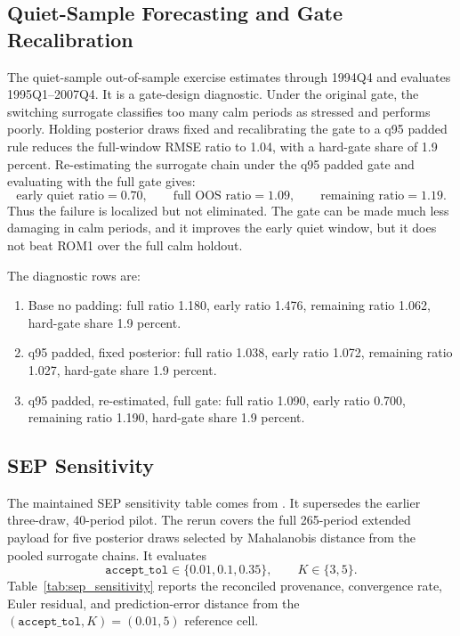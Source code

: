 \documentclass[12pt]{article}
\begin{document}
\subsection{Quiet-Sample Forecasting and Gate Recalibration}
\label{apptech:oos_gate}

The quiet-sample out-of-sample exercise estimates through 1994Q4 and evaluates
1995Q1--2007Q4. It is a gate-design diagnostic. Under the original gate, the
switching surrogate classifies too many calm periods as stressed and performs
poorly. Holding posterior draws fixed and recalibrating the gate to a q95
padded rule reduces the full-window RMSE ratio to 1.04, with a hard-gate share
of 1.9 percent. Re-estimating the surrogate chain under the q95 padded gate and
evaluating with the full gate gives:
\[
  \text{early quiet ratio}=0.70,\qquad
  \text{full OOS ratio}=1.09,\qquad
  \text{remaining ratio}=1.19.
\]
Thus the failure is localized but not eliminated. The gate can be made much
less damaging in calm periods, and it improves the early quiet window, but it
does not beat ROM1 over the full calm holdout.

The diagnostic rows are:
\begin{enumerate}[leftmargin=2em,itemsep=0.15em]
\item Base no padding: full ratio 1.180, early ratio 1.476, remaining ratio
      1.062, hard-gate share 1.9 percent.
\item q95 padded, fixed posterior: full ratio 1.038, early ratio 1.072,
      remaining ratio 1.027, hard-gate share 1.9 percent.
\item q95 padded, re-estimated, full gate: full ratio 1.090, early ratio
      0.700, remaining ratio 1.190, hard-gate share 1.9 percent.
\end{enumerate}

\subsection{SEP Sensitivity}
\label{apptech:sep_sensitivity_record}

The maintained SEP sensitivity table comes from
. It supersedes the
earlier three-draw, 40-period pilot. The rerun covers the full 265-period
extended payload for five posterior draws selected by Mahalanobis distance
from the pooled surrogate chains. It evaluates
\[
  \texttt{accept\_tol}\in\{0.01,0.1,0.35\},\qquad
  K\in\{3,5\}.
\]
Table~\ref{tab:sep_sensitivity} reports the reconciled provenance, convergence
rate, Euler residual, and prediction-error distance from the
\((\texttt{accept\_tol},K)=(0.01,5)\) reference cell.
\end{document}
